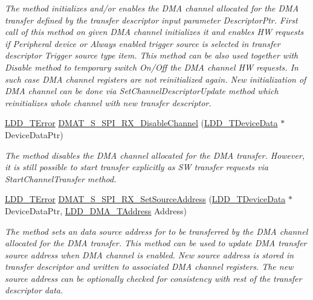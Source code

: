 \begin{DoxyCompactItemize}
\begin{DoxyCompactList}\small\item\em The method initializes and/or enables the D\-M\-A channel allocated for the D\-M\-A transfer defined by the transfer descriptor input parameter Descriptor\-Ptr. First call of this method on given D\-M\-A channel initializes it and enables H\-W requests if Peripheral device or Always enabled trigger source is selected in transfer descriptor Trigger source type item. This method can be also used together with Disable method to temporary switch On/\-Off the D\-M\-A channel H\-W requests. In such case D\-M\-A channel registers are not reinitialized again. New initialization of D\-M\-A channel can be done via Set\-Channel\-Descriptor\-Update method which reinitializes whole channel with new transfer descriptor. \end{DoxyCompactList}\item 
\hyperlink{group___p_e___types__module_ga24c2b045fd04e79e85f261ce4df35588}{L\-D\-D\-\_\-\-T\-Error} \hyperlink{group___d_m_a_t___s___s_p_i___r_x__module_ga693d74a3e5ae5f976ee0c1026c67cfe9}{D\-M\-A\-T\-\_\-\-S\-\_\-\-S\-P\-I\-\_\-\-R\-X\-\_\-\-Disable\-Channel} (\hyperlink{group___p_e___types__module_gac5cf1362f1f0e3a2ce71b1bf2276d091}{L\-D\-D\-\_\-\-T\-Device\-Data} $\ast$Device\-Data\-Ptr)
\begin{DoxyCompactList}\small\item\em The method disables the D\-M\-A channel allocated for the D\-M\-A transfer. However, it is still possible to start transfer explicitly as S\-W transfer requests via Start\-Channel\-Transfer method. \end{DoxyCompactList}\item 
\hyperlink{group___p_e___types__module_ga24c2b045fd04e79e85f261ce4df35588}{L\-D\-D\-\_\-\-T\-Error} \hyperlink{group___d_m_a_t___s___s_p_i___r_x__module_ga7b59a41d88892ec3cb5a344e39fa4f61}{D\-M\-A\-T\-\_\-\-S\-\_\-\-S\-P\-I\-\_\-\-R\-X\-\_\-\-Set\-Source\-Address} (\hyperlink{group___p_e___types__module_gac5cf1362f1f0e3a2ce71b1bf2276d091}{L\-D\-D\-\_\-\-T\-Device\-Data} $\ast$Device\-Data\-Ptr, \hyperlink{group___p_e___types__module_gab8287f62db7ff96992355760b652cd07}{L\-D\-D\-\_\-\-D\-M\-A\-\_\-\-T\-Address} Address)
\begin{DoxyCompactList}\small\item\em The method sets an data source address for to be transferred by the D\-M\-A channel allocated for the D\-M\-A transfer. This method can be used to update D\-M\-A transfer source address when D\-M\-A channel is enabled. New source address is stored in transfer descriptor and written to associated D\-M\-A channel registers. The new source address can be optionally checked for consistency with rest of the transfer descriptor data. \end{DoxyCompactList}\item 

\end{DoxyCompactItemize}
